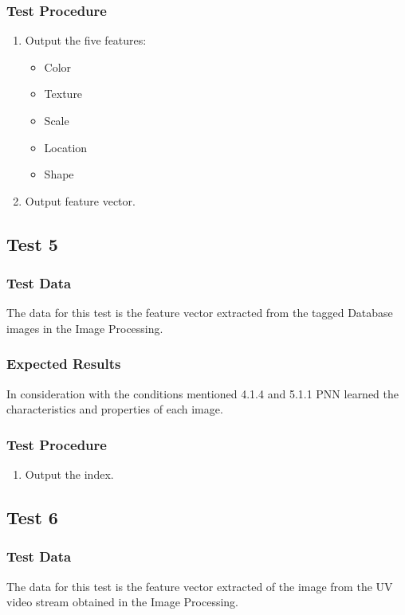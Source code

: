 \documentclass[12pt]{article}
\begin{document}
\subsubsection{Test Procedure}
\begin{enumerate}
  \item Output the five features:
  \begin{itemize}
  \item Color
  \item Texture
  \item Scale
  \item Location
  \item Shape
  \end{itemize}
  \item Output feature vector.
  \end{enumerate}

\subsection{Test 5}
\subsubsection{Test Data}
The data for this test is the feature vector extracted from the tagged Database images in the Image Processing.

\subsubsection{Expected Results}
In consideration with the conditions mentioned 4.1.4 and 5.1.1 PNN learned the characteristics and properties of each image.
\subsubsection{Test Procedure}
\begin{enumerate}
  \item Output the index.
  \end{enumerate}
\subsection{Test 6}
\subsubsection{Test Data}
The data for this test is the feature vector extracted of the image from the UV video stream obtained in the Image Processing.
\end{document}
